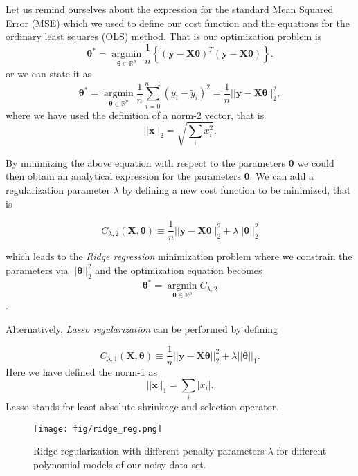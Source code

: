 \documentclass[%
oneside,                 %
final,                   %
10pt]{article}
\begin{document}
Let us remind ourselves about the expression for the standard Mean Squared Error (MSE) which we used to define our cost function and the equations for the ordinary least squares (OLS) method. That is our optimization problem is
\[
\bm{\theta}^* = \underset{\bm{\theta}\in {\mathbb{R}}^{p}}{\operatorname{argmin}} \frac{1}{n}\left\{\left(\bm{y}-\bm{X}\bm{	\theta}\right)^T\left(\bm{y}-\bm{X}\bm{\theta}\right)\right\}.
\]
or we can state it as
\[
\bm{\theta}^* = \underset{\bm{\theta}\in {\mathbb{R}}^{p}}{\operatorname{argmin}}
\frac{1}{n}\sum_{i=0}^{n-1}\left(y_i-\tilde{y}_i\right)^2=\frac{1}{n}\vert\vert \bm{y}-\bm{X}\bm{\theta}\vert\vert_2^2,
\]
where we have used the definition of  a norm-2 vector, that is
\[
\vert\vert \bm{x}\vert\vert_2 = \sqrt{\sum_i x_i^2}. 
\]

By minimizing the above equation with respect to the parameters
$\bm{\theta}$ we could then obtain an analytical expression for the
parameters $\bm{\theta}$.  We can add a regularization parameter $\lambda$ by
defining a new cost function to be minimized, that is

\[
C_{\lambda,2} \left( \bm{X}, \bm{\theta} \right) \equiv
\frac{1}{n}\vert\vert \bm{y}-\bm{X}\bm{\theta}\vert\vert_2^2+\lambda\vert\vert \bm{\theta}\vert\vert_2^2 
\]

which leads to the \emph{Ridge regression} minimization problem where we
constrain the parameters via $\vert\vert \bm{\theta}\vert\vert_2^2$ and the optimization equation becomes
\[
\bm{\theta}^* = \underset{\bm{\theta}\in {\mathbb{R}}^{p}}{\operatorname{argmin}}
C_{\lambda,2}
\].

Alternatively, \emph{Lasso regularization} can be performed by defining

\[
C_{\lambda,1} \left( \bm{X},\bm{\theta} \right) \equiv
\frac{1}{n}\vert\vert \bm{y}-\bm{X}\bm{\theta}\vert\vert_2^2+\lambda\vert\vert \bm{\theta}\vert\vert_1.
\]
Here we have defined the norm-1 as 
\[
\vert\vert \bm{x}\vert\vert_1 = \sum_i \vert x_i\vert. 
\]
Lasso stands for least absolute shrinkage and selection operator.


\begin{figure}[!ht]  %
  \centerline{\texttt{[image: fig/ridge\_reg.png]}}
  \caption{
  Ridge regularization with different penalty parameters $\lambda$ for different polynomial models of our noisy data set. \label{fig-ridge_reg}
  }
\end{figure}
\end{document}

